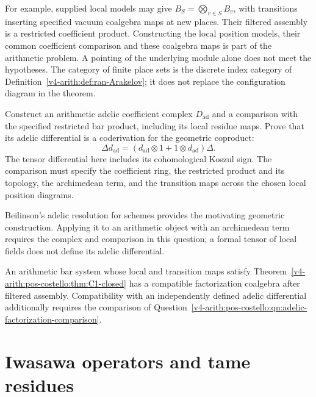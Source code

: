 For example, supplied local models may give
\(B_S=\bigotimes_{v\in S}B_v\), with transitions inserting
specified vacuum coalgebra maps at new places. Their filtered
assembly is a restricted coefficient product. Constructing the
local position models, their common coefficient comparison and
these coalgebra maps is part of the arithmetic problem. A pointing
of the underlying module alone does not meet the hypotheses.
The category of finite place sets is the discrete index category
of Definition~\ref{v4-arith:def:ran-Arakelov}; it does not replace
the configuration diagram in the theorem.

\begin{question}
\label{v4-arith:pos-costello:qn:adelic-factorization-comparison}
Construct an arithmetic adelic coefficient complex \(D_{\mathrm{ad}}\)
and a comparison with the specified restricted bar product, including
its local residue maps. Prove that its adelic differential is a
coderivation for the geometric coproduct:
\[
 \Delta d_{\mathrm{ad}}
    =(d_{\mathrm{ad}}\otimes1+1\otimes d_{\mathrm{ad}})\Delta.
\]
The tensor differential here includes its cohomological Koszul sign.
The comparison must specify the coefficient ring, the restricted
product and its topology, the archimedean term, and the transition
maps across the chosen local position diagrams.
\end{question}

Beilinson's adelic resolution for schemes provides the motivating
geometric construction. Applying it to an arithmetic object with
an archimedean term requires the complex and comparison in this
question; a formal tensor of local fields does not define its
adelic differential.

\begin{corollary}
\label{v4-arith:pos-costello:cor:C1-closed}
An arithmetic bar system whose local and transition maps satisfy
Theorem~\ref{v4-arith:pos-costello:thm:C1-closed} has a compatible
factorization coalgebra after filtered assembly. Compatibility
with an independently defined adelic differential additionally
requires the comparison of
Question~\ref{v4-arith:pos-costello:qn:adelic-factorization-comparison}.
\end{corollary}

\section{Iwasawa operators and tame residues}
\label{v4-arith:pos-costello:C2}

